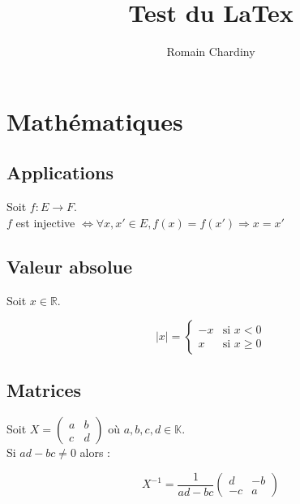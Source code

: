 \documentclass[11pt]{article}
\title{Test du LaTex}
\author{Romain Chardiny}
\begin{document}
  \maketitle
  \section{Mathématiques}

  \subsection{Applications}

  Soit $f: E \to F $. \\
  $f$ est injective $\Leftrightarrow \forall x,x' \in E, f(x) = f(x') \Rightarrow x = x'$

  \subsection{Valeur absolue}

  Soit $x \in \mathbb{R}$.

  \begin{equation*}
  |x| =
    \begin{cases}
      -x & \text{si } x < 0 \\
      x  & \text{si } x \geq 0
    \end{cases}
  \end{equation*}

  \subsection{Matrices}

  Soit $X = \begin{pmatrix}
  a & b \\
  c & d
  \end{pmatrix}$ où $a,b,c,d \in \mathbb{K}$. \\
  Si $ad - bc \ne 0$ alors :

  \[
  X^{-1} = \frac{1}{ad - bc} \begin{pmatrix}
  d & -b \\
  -c & a
  \end{pmatrix}
  \]
\end{document}
